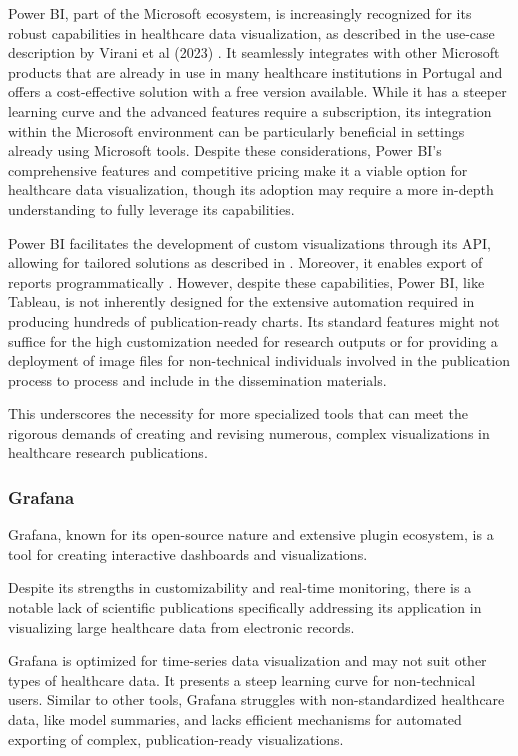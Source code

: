 Power BI, part of the Microsoft ecosystem, is increasingly recognized for its robust capabilities in healthcare data visualization, as described in the use-case description by Virani et al (2023) \cite{soa27}. It seamlessly integrates with other Microsoft products that are already in use in many healthcare institutions in Portugal and offers a cost-effective solution with a free version available. While it has a steeper learning curve and the advanced features require a subscription, its integration within the Microsoft environment can be particularly beneficial in settings already using Microsoft tools. Despite these considerations, Power BI's comprehensive features and competitive pricing make it a viable option for healthcare data visualization, though its adoption may require a more in-depth understanding to fully leverage its capabilities.

Power BI facilitates the development of custom visualizations through its API, allowing for tailored solutions as described in \cite{soa28}. Moreover, it enables export of reports programmatically \cite{soa29}. However, despite these capabilities, Power BI, like Tableau, is not inherently designed for the extensive automation required in producing hundreds of publication-ready charts. Its standard features might not suffice for the high customization needed for research outputs or for providing a deployment of image files for non-technical individuals involved in the publication process to process and include in the dissemination materials.

This underscores the necessity for more specialized tools that can meet the rigorous demands of creating and revising numerous, complex visualizations in healthcare research publications.

\subsubsection{Grafana}\label{grafana}

Grafana, known for its open-source nature and extensive plugin ecosystem, is a tool for creating interactive dashboards and visualizations.

Despite its strengths in customizability and real-time monitoring, there is a notable lack of scientific publications specifically addressing its application in visualizing large healthcare data from electronic records.

Grafana is optimized for time-series data visualization and may not suit other types of healthcare data. It presents a steep learning curve for non-technical users. Similar to other tools, Grafana struggles with non-standardized healthcare data, like model summaries, and lacks efficient mechanisms for automated exporting of complex, publication-ready visualizations.

